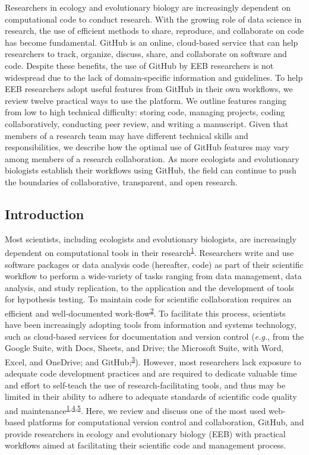 Researchers in ecology and evolutionary biology are increasingly dependent on computational code to conduct research.
With the growing role of data science in research, the use of efficient methods to share, reproduce, and collaborate on code has become fundamental.
GitHub is an online, cloud-based service that can help researchers to track, organize, discuss, share, and collaborate on software and code.
Despite these benefits, the use of GitHub by EEB researchers is not widespread due to the lack of domain-specific information and guidelines.
To help EEB researchers adopt useful features from GitHub in their own workflows, we review twelve practical ways to use the platform.
We outline features ranging from low to high technical difficulty: storing code, managing projects, coding collaboratively, conducting peer review, and writing a manuscript.
Given that members of a research team may have different technical skills and responsibilities, we describe how the optimal use of GitHub features may vary among members of a research collaboration.
As more ecologists and evolutionary biologists establish their workflows using GitHub, the field can continue to push the boundaries of collaborative, transparent, and open research.

\hypertarget{introduction}{%
\subsection{Introduction}\label{introduction}}

Most scientists, including ecologists and evolutionary biologists, are increasingly dependent on computational tools in their research\textsuperscript{\protect\hyperlink{ref-fJWFe93e}{1}}.
Researchers write and use software packages or data analysis code (hereafter, code) as part of their scientific workflow to perform a wide-variety of tasks ranging from data management, data analysis, and study replication, to the application and the development of tools for hypothesis testing.
To maintain code for scientific collaboration requires an efficient and well-documented work-flow\textsuperscript{\protect\hyperlink{ref-1Kqna6l2}{2}}.
To facilitate this process, scientists have been increasingly adopting tools from information and systems technology, such as cloud-based services for documentation and version control (\emph{e.g.}, from the Google Suite, with Docs, Sheets, and Drive; the Microsoft Suite, with Word, Excel, and OneDrive; and GitHub;\textsuperscript{\protect\hyperlink{ref-10ghgV3S8}{3}}).
However, most researchers lack exposure to adequate code development practices and are required to dedicate valuable time and effort to self-teach the use of research-facilitating tools, and thus may be limited in their ability to adhere to adequate standards of scientific code quality and maintenance\textsuperscript{\protect\hyperlink{ref-fJWFe93e}{1},\protect\hyperlink{ref-10SpoByIw}{4},\protect\hyperlink{ref-O6UbstGG}{5}}.
Here, we review and discuss one of the most used web-based platforms for computational version control and collaboration, GitHub, and provide researchers in ecology and evolutionary biology (EEB) with practical workflows aimed at facilitating their scientific code and management process.

